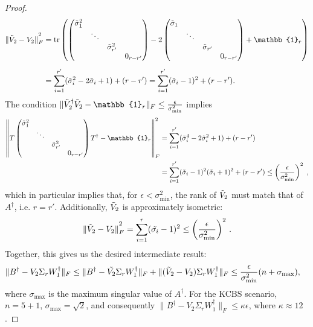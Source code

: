 \begin{proof}
\begin{align*}
\|\Tilde{V}_2-V_2\|_F^{\textstyle ^2} & =\operatorname{tr}\left(
\begin{pmatrix}
\Tilde{\sigma}_1^2&&&\\
&\ddots&&\\
&&\Tilde{\sigma}_{r'}^2&\\
&&& 0_{r-r'}
\end{pmatrix} -2
\begin{pmatrix}
\Tilde{\sigma}_1&&&\\
&\ddots&&\\
&&\Tilde{\sigma}_{r'}&\\
&&& 0_{r-r'}
\end{pmatrix}+\mathbb{1}_r\right)\\[0.5em] &  =\sum_{i=1}^{r'}(\Tilde{\sigma}_i^2-2\Tilde{\sigma}_i+1) + (r-r') =\sum_{i=1}^{r'}(\Tilde{\sigma}_i-1)^2+(r-r').
\end{align*}
The condition $\|\Tilde{V}_2^{\dag}\Tilde{V}_2 -\mathbb{1}_r\|_F\leq\frac{\epsilon}{\sigma_{\text{min}}^2}$ implies
\begin{align*}
\left\|T
\begin{pmatrix}
\Tilde{\sigma}_1^2&&& \\
&\ddots&& \\
&&\Tilde{\sigma}_{r'}^2& \\
&&&0_{r-r'}
\end{pmatrix}T^{\dag}-\mathbb{1}_r\right\|_F^2 & =\sum_{i=1}^{r'}(\Tilde{\sigma}_i^4-2\Tilde{\sigma}_i^2+1) + (r-r') \\
& = \sum_{i=1}^{r'}(\Tilde{\sigma}_i-1)^2(\Tilde{\sigma}_i+1)^2 + (r-r')\leq \left(\frac{\epsilon}{\sigma_{\text{min}}^2}\right)^2\;,
\end{align*}
which in particular implies that, for $\epsilon<\sigma_{\text{min}}^2$, the rank of $\Tilde{V}_2$ must match that of $A^{\dag}$, i.e. $r=r'$. Additionally, $\Tilde{V}_2$ is approximately isometric:
\begin{equation*}
\|\Tilde{V}_2-V_2\|_F^{\textstyle ^2} = \sum_{i=1}^r(\Tilde{\sigma_i}-1)^2\leq\left(\frac{\epsilon}{\sigma_{\text{min}}^2}\right)^2\thinspace.
\end{equation*}
Together, this gives us the desired intermediate result:
\begin{align*}
\|B^{\dag}-V_2\Sigma_r W_1^{\dag}\|_F\leq \|B^{\dag}-\Tilde{V_2}\Sigma_r W_1^{\dag}\|_F + \|(\Tilde{V}_2-V_2)\Sigma_r W_1^{\dag}\|_F & \leq \frac{\epsilon}{\sigma_{\text{min}}^2}(n+\sigma_{\text{max}}),
\end{align*}
where $\sigma_{\text{max}}$ is the maximum singular value of $A^{\dag}$. For the KCBS scenario, $n=5+1$, $\sigma_{\text{max}}=\sqrt{2}$, and consequently $\|B^{\dag}-V_2\Sigma_r W_1^{\dag}\|_F\leq \kappa\epsilon$, where $\kappa \approx 12$.


\end{proof}
